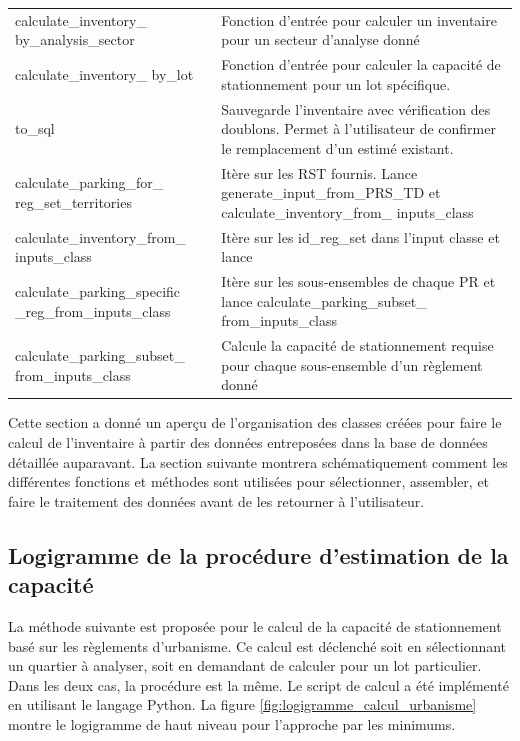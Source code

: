 {\begin{longtable}{p{5cm} p{11cm} }
            calculate\_inventory\_ by\_analysis\_sector & Fonction d'entrée pour calculer un inventaire pour un secteur d'analyse donné \\
            calculate\_inventory\_ by\_lot & Fonction d'entrée pour calculer la capacité de stationnement pour un lot spécifique.  \\
            to\_sql & Sauvegarde l'inventaire avec vérification des doublons. Permet à l'utilisateur de confirmer le remplacement d'un estimé existant. \\
            calculate\_parking\_for\_ reg\_set\_territories & Itère sur les \ac{RST} fournis. Lance generate\_input\_from\_PRS\_TD et calculate\_inventory\_from\_ inputs\_class\\
            calculate\_inventory\_from\_ inputs\_class & Itère sur les id\_reg\_set dans l'input classe et lance \\
            calculate\_parking\_specific \_reg\_from\_inputs\_class & Itère sur les sous-ensembles de chaque \ac{PR} et lance calculate\_parking\_subset\_ from\_inputs\_class  \\
            calculate\_parking\_subset\_ from\_inputs\_class & Calcule la capacité de stationnement requise pour chaque sous-ensemble d'un règlement donné \\
        \end{longtable}}

    Cette section a donné un aperçu de l'organisation des classes créées pour faire le calcul de l'inventaire à partir des données entreposées dans la base de données détaillée auparavant. La section suivante montrera schématiquement comment les différentes fonctions et méthodes sont utilisées pour sélectionner, assembler, et faire le traitement des données avant de les retourner à l'utilisateur.

    \subsection{Logigramme de la procédure d'estimation de la capacité}\label{ssec:logigramme-calcul-stationnement}
        La méthode suivante est proposée pour le calcul de la capacité de stationnement basé sur les règlements d'urbanisme. Ce calcul est déclenché soit en sélectionnant un quartier à analyser, soit en demandant de calculer pour un lot particulier. Dans les deux cas, la procédure est la même. Le script de calcul a été implémenté en utilisant le langage Python. La figure \ref{fig:logigramme_calcul_urbanisme} montre le logigramme de haut niveau pour l'approche par les minimums. \par
        

